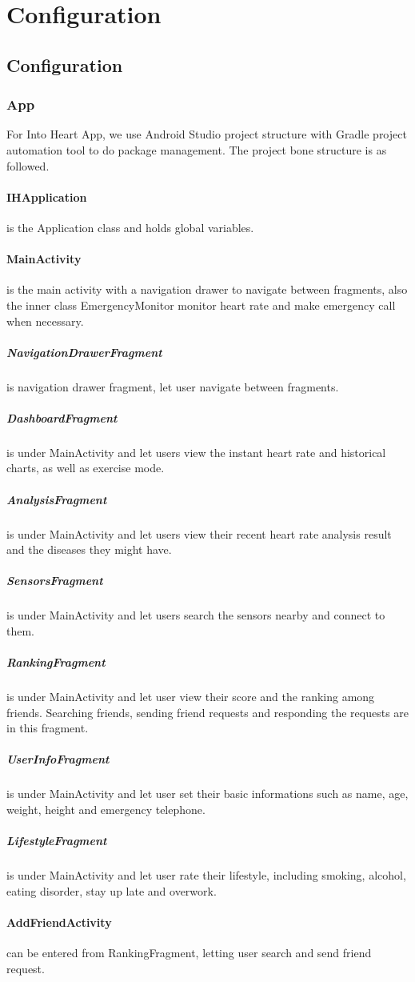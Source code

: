 \documentclass[10pt,a4paper,final]{scrartcl}
\begin{document}
\section{Configuration}
\subsection{Configuration}
\subsubsection{App}
For Into Heart App, we use Android Studio project structure with Gradle project automation tool to do package management. The project bone structure is as followed.

\paragraph{IHApplication} is the Application class and holds global variables.
\paragraph{MainActivity} is the main activity with a navigation drawer to navigate between fragments, also the inner class EmergencyMonitor monitor heart rate and make emergency call when necessary.
\subparagraph{NavigationDrawerFragment} is navigation drawer fragment, let user navigate between fragments.
\subparagraph{DashboardFragment} is under MainActivity and let users view the instant heart rate and historical charts, as well as exercise mode.
\subparagraph{AnalysisFragment} is under MainActivity and let users view their recent heart rate analysis result  and the diseases they might have.
\subparagraph{SensorsFragment} is under MainActivity and let users search the sensors nearby and connect to them.
\subparagraph{RankingFragment} is under MainActivity and let user view their score and the ranking among friends. Searching friends, sending friend requests and responding the requests are in this fragment.
\subparagraph{UserInfoFragment} is under MainActivity and let user set their basic informations such as name, age, weight, height and emergency telephone.
\subparagraph{LifestyleFragment} is under MainActivity and let user rate their lifestyle, including smoking, alcohol, eating disorder, stay up late and overwork.
\paragraph{AddFriendActivity} can be entered from RankingFragment, letting user search and send friend request.
\end{document}
